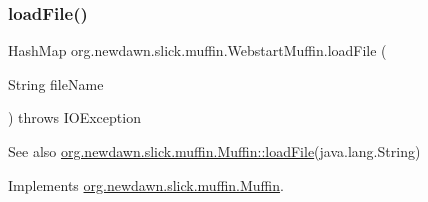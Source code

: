 \subsubsection{\texorpdfstring{load\+File()}{loadFile()}}
{\footnotesize\ttfamily Hash\+Map org.\+newdawn.\+slick.\+muffin.\+Webstart\+Muffin.\+load\+File (\begin{DoxyParamCaption}\item[{String}]{file\+Name }\end{DoxyParamCaption}) throws I\+O\+Exception\hspace{0.3cm}{\ttfamily [inline]}}

\begin{DoxySeeAlso}{See also}
\mbox{\hyperlink{interfaceorg_1_1newdawn_1_1slick_1_1muffin_1_1_muffin_a2d6256b6d8f26b294f06341985047fbe}{org.\+newdawn.\+slick.\+muffin.\+Muffin\+::load\+File}}(java.\+lang.\+String) 
\end{DoxySeeAlso}


Implements \mbox{\hyperlink{interfaceorg_1_1newdawn_1_1slick_1_1muffin_1_1_muffin_a2d6256b6d8f26b294f06341985047fbe}{org.\+newdawn.\+slick.\+muffin.\+Muffin}}.


